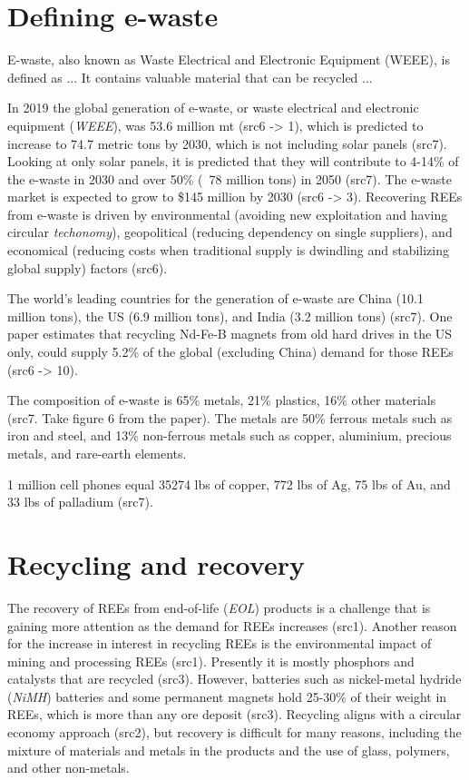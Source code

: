 
\section{Defining e-waste}

E-waste, also known as Waste Electrical and Electronic Equipment (WEEE), is defined as ... 
It contains valuable material that can be recycled ...

In 2019 the global generation of e-waste, or waste electrical and electronic equipment (\textit{WEEE}), was 53.6 million mt (src6 -> 1), which is predicted to increase to 74.7 metric tons by 2030, which is not including solar panels (src7). Looking at only solar panels, it is predicted that they will contribute to 4-14\% of the e-waste in 2030 and over 50\% (~78 million tons) in 2050 (src7). The e-waste market is expected to grow to \$145 million by 2030 (src6 -> 3). Recovering REEs from e-waste is driven by environmental (avoiding new exploitation and having circular \textit{techonomy}), geopolitical (reducing dependency on single suppliers), and economical (reducing costs when traditional supply is dwindling and stabilizing global supply) factors (src6).

The world's leading countries for the generation of e-waste are China (10.1 million tons), the US (6.9 million tons), and India (3.2 million tons) (src7). One paper estimates that recycling Nd-Fe-B magnets from old hard drives in the US only, could supply 5.2\% of the global (excluding China) demand for those REEs (src6 -> 10).

The composition of e-waste is 65\% metals, 21\% plastics, 16\% other materials (src7. Take figure 6 from the paper). The metals are 50\% ferrous metals such as iron and steel, and 13\% non-ferrous metals such as copper, aluminium, precious metals, and rare-earth elements. 

1 million cell phones equal 35274 lbs of copper, 772 lbs of Ag, 75 lbs of Au, and 33 lbs of palladium (src7).

\section{Recycling and recovery}

The recovery of REEs from end-of-life (\textit{EOL}) products is a challenge that is gaining more attention as the demand for REEs increases (src1). Another reason for the increase in interest in recycling REEs is the environmental impact of mining and processing REEs (src1). Presently it is mostly phosphors and catalysts that are recycled (src3). However, batteries such as nickel-metal hydride (\textit{NiMH}) batteries and some permanent magnets hold 25-30\% of their weight in REEs, which is more than any ore deposit (src3). Recycling aligns with a circular economy approach (src2), but recovery is difficult for many reasons, including the mixture of materials and metals in the products and the use of glass, polymers, and other non-metals.

